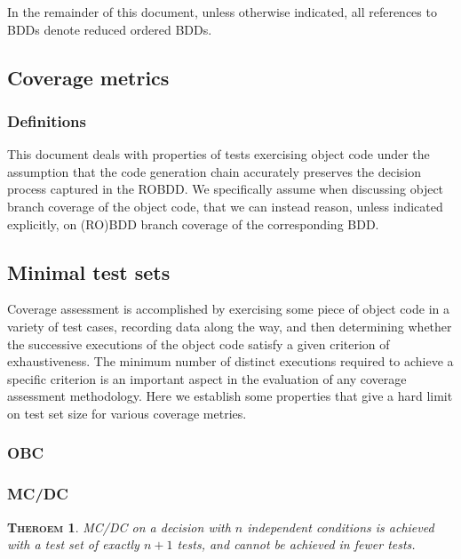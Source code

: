 \documentclass[a4paper,12pt,twoside]{article}
\newtheorem{theorem}{\textsc{Theroem}}
\begin{document}
In the remainder of this document, unless otherwise indicated, all
references to BDDs denote reduced ordered BDDs.

\subsection{Coverage metrics}

\subsubsection{Definitions}


This document deals with properties of tests exercising object code under
the assumption that the code generation chain accurately preserves the
decision process captured in the ROBDD. We specifically assume when
discussing object branch coverage of the object code, that we can instead
reason, unless indicated explicitly, on (RO)BDD branch coverage
of the corresponding BDD.

\subsection{Minimal test sets}

Coverage assessment is accomplished by exercising some piece of object
code in a variety of test cases, recording data along the way, and
then determining whether the successive executions of the object code
satisfy a given criterion of exhaustiveness. The minimum number of distinct
executions required to achieve a specific criterion is an important
aspect in the evaluation of any coverage assessment methodology. Here
we establish some properties that give a hard limit on test set size
for various coverage metries.

\subsubsection{OBC}

\subsubsection{MC/DC}

\begin{theorem}
MC/DC on a decision with $n$ independent conditions is achieved with
a test set of exactly $n+1$ tests, and cannot be achieved in fewer tests.
\end{theorem}
\end{document}
